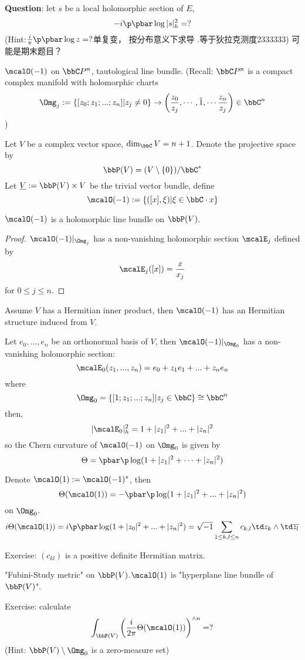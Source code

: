 \textbf{Question}: let $s$ be a local holomorphic section of $E$,
$$-i\p\pbar\log|s|_h^2=?$$
(Hint:$\frac{i}{\pi}\p\pbar\log z=?$单复变，
按分布意义下求导 .等于狄拉克测度2333333)
{\color{red}可能是期末题目？}

\begin{example}
$\mcalO(-1)$ on $\bbC P^n$, tautological line bundle.
(Recall: $\bbC P^n$ is a compact complex manifold with holomorphic charts
$$\Omg_j:=\{[z_0;z_1;...;z_n]|z_j\neq 0\}\to
\left(
\frac{z_0}{z_j},\cdots,\hat{1},\cdots
\frac{z_n}{z_j}
\right)\in\bbC^n$$
)
\end{example}

Let $V$ be a complex vector space, $\dim_\bbC V=n+1$.
Denote the projective space by
$$\bbP(V)=(V\setminus\{0\})/\bbC^*$$
Let $\underline{V}:=\bbP(V)\times V$ be the trivial vector bundle,
define
$$\mcalO(-1):=\{([x],\xi)|\xi\in\bbC\cdot x\}$$

\begin{prop}
$\mcalO(-1)$ is a holomorphic line bundle on $\bbP(V)$.
\end{prop}
\begin{proof}
$\mcalO(-1)|_{\Omg_j}$ has a non-vanishing holomorphic section $\mcalE_j$ defined by
$$\mcalE_j([x])=\frac{x}{x_j}$$
for $0\leq j\leq n$.
\end{proof}

Assume $V$ has a Hermitian inner product, then $\mcalO(-1)$ has an
Hermitian structure induced from $V$.

Let $e_0,...,e_n$ be an orthonormal basis of $V$, then
$\mcalO(-1)|_{\Omg_0}$ has a non-vanishing holomorphic section:
$$\mcalE_0(z_1,...,z_n)=e_0+z_1e_1+...+z_ne_n$$
where
$$\Omg_0=\{[1;z_1;...;z_n]|z_j\in\bbC\}\cong\bbC^n$$
then,
$$|\mcalE_0|^2_h=1+|z_1|^2+...+|z_n|^2$$
so the Chern curvature of $\mcalO(-1)$ on $\Omg_0$ is given by
$$\Theta=\pbar\p\log(1+|z_1|^2+\cdots+|z_n|^2)$$

Denote $\mcalO(1):=\mcalO(-1)^*$, then
$$\Theta(\mcalO(1))=-\pbar\p\log(1+|z_1|^2+...+|z_n|^2)$$
on $\Omg_0$.
$$i\Theta(\mcalO(1))=i\p\pbar\log(1+|z_0|^2+...+|z_n|^2)
=\sqrt{-1}\sum_{1\leq k,l\leq n}
c_{k,l}\td z_k\wedge\td\overline{z_l}$$

Exercise: $(c_{kl})$ is a positive definite Hermitian matrix.

"Fubini-Study metric" on $\bbP(V)$.$\mcalO(1)$ is
"hyperplane line bundle of $\bbP(V)$".

Exercise: calculate
$$\int_{\bbP(V)}
    \left(
      \frac{i}{2\pi}
      \Theta(\mcalO(1))
    \right)^{\wedge n}
=?
$$
(Hint: $\bbP(V)\setminus\Omg_0$ is a zero-measure set)


